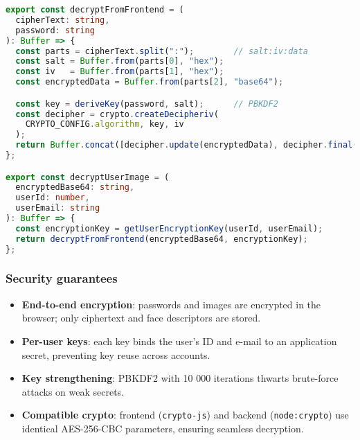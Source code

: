 \begin{lstlisting}[language=TypeScript, caption={Server-side decryption of encrypted data from the frontend}, label={lst:server-decryption}]
export const decryptFromFrontend = (
  cipherText: string,
  password: string
): Buffer => {
  const parts = cipherText.split(":");        // salt:iv:data
  const salt = Buffer.from(parts[0], "hex");
  const iv   = Buffer.from(parts[1], "hex");
  const encryptedData = Buffer.from(parts[2], "base64");

  const key = deriveKey(password, salt);      // PBKDF2
  const decipher = crypto.createDecipheriv(
    CRYPTO_CONFIG.algorithm, key, iv
  );
  return Buffer.concat([decipher.update(encryptedData), decipher.final()]);
};

export const decryptUserImage = (
  encryptedBase64: string,
  userId: number,
  userEmail: string
): Buffer => {
  const encryptionKey = getUserEncryptionKey(userId, userEmail);
  return decryptFromFrontend(encryptedBase64, encryptionKey);
};
\end{lstlisting}

\subsubsection{Security guarantees}

\begin{itemize}
  \item \textbf{End-to-end encryption}: passwords and images are encrypted in the browser; only ciphertext and face descriptors are stored.  
  \item \textbf{Per-user keys}: each key binds the user's ID and e-mail to an application secret, preventing key reuse across accounts.  
  \item \textbf{Key strengthening}: PBKDF2 with 10 000 iterations thwarts brute-force attacks on weak secrets.  
  \item \textbf{Compatible crypto}: frontend (\texttt{crypto-js}) and backend (\texttt{node:crypto}) use identical AES-256-CBC parameters, ensuring seamless decryption.  
\end{itemize}

